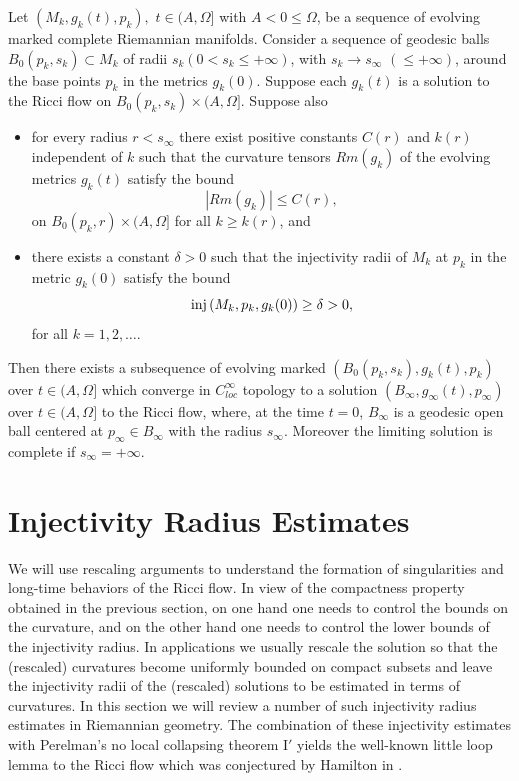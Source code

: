 \begin{theorem}
  \label{thm:cz-hamilton-compactness-for-ricci-flows}
Let $(M_k,g_k(t),p_k),$ $t\in(A,\Omega]$ with $A<0 \leq \Omega$,
be a sequence of evolving marked complete Riemannian manifolds.
Consider a sequence of geodesic balls $B_0(p_k,s_k) \subset M_k$
of radii $s_k (0<s_k \leq +{\infty})$, with $s_k \rightarrow
s_{\infty}$ $(\leq +{\infty})$, around the base points $p_k$ in
the metrics $g_k(0)$. Suppose each $g_k(t)$ is a solution to the
Ricci flow on $B_0(p_k,s_k) \times (A,\Omega]$. Suppose also
\begin{itemize}
\item[(i)] for every radius $r<s_{\infty}$ there exist positive
constants $C(r)$ and $k(r)$ independent of $k$ such that the
curvature tensors $Rm(g_k)$ of the evolving metrics $g_k(t)$
satisfy the bound
$$
|Rm(g_k)|\leq C(r),
$$
on $B_0(p_k,r) \times (A,\Omega]$ for all $k \geq k(r)$, and
\item[(ii)] there exists a constant $\delta > 0$ such that the
injectivity radii of $M_k$ at $p_k$ in the metric $g_k(0)$ satisfy
the bound
$$
{\rm inj}\,(M_k,p_k,g_k(0))\geq\delta>0,
$$
for all $k = 1, 2, \ldots$.
\end{itemize}
Then there exists a subsequence of evolving marked
$(B_0(p_k,s_k),g_k(t),p_k)$ over $t \in (A,\Omega]$ which converge
in $C^\infty_{loc}$ topology to a solution
$(B_{\infty},g_{\infty}(t),p_{\infty})$ over $t \in (A,\Omega]$ to
the Ricci flow, where, at the time $t=0$, $B_{\infty}$ is a
geodesic open ball centered at $p_{\infty}\in B_{\infty}$ with the
radius $s_{\infty}$. Moreover the limiting solution is complete if
$s_{\infty}=+\infty$.
\end{theorem}


\section{Injectivity Radius Estimates}

We will use rescaling arguments to understand the formation of
singularities and long-time behaviors of the Ricci flow. In view
of the compactness property obtained in the previous section, on
one hand one needs to control the bounds on the curvature, and on
the other hand one needs to control the lower bounds of the
injectivity radius. In applications we usually rescale the
solution so that the (rescaled) curvatures become uniformly
bounded on compact subsets and leave the injectivity radii of the
(rescaled) solutions to be estimated in terms of curvatures. In
this section we will review a number of such injectivity radius
estimates in Riemannian geometry. The combination of these
injectivity estimates with Perelman's no local collapsing theorem
I$'$ yields the well-known little loop lemma to the Ricci flow
which was conjectured by Hamilton in \cite{Ha95F}.

